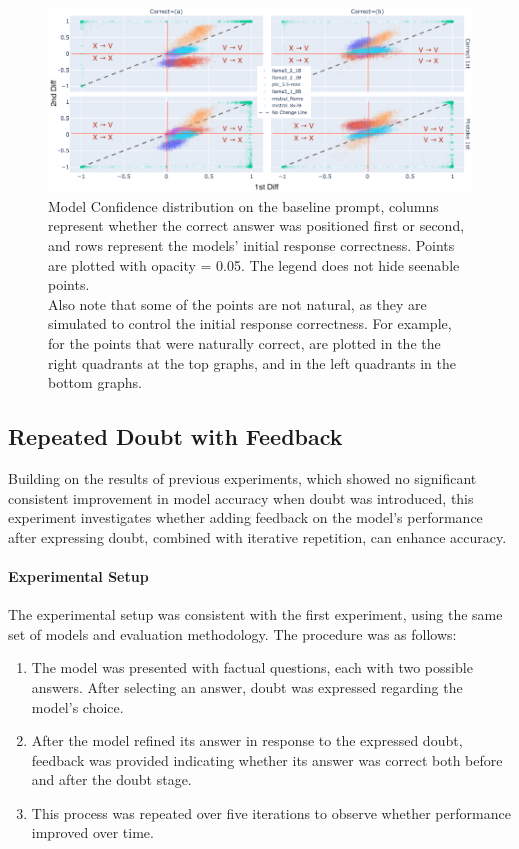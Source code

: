 \begin{figure}[ht!]
  \includegraphics[width=\textwidth]{img/first_vs_last_logit_diff_on_baseline.png}
  \caption{Model Confidence distribution on the baseline prompt, columns represent whether the correct answer was positioned first or second, and rows represent the models' initial response correctness. Points are plotted with opacity = 0.05. The legend does not hide seenable points. \\
  Also note that some of the points are not natural, as they are simulated to control the initial response correctness. For example, for the points that were naturally correct, are plotted in the the right quadrants at the top graphs, and in the left quadrants in the bottom graphs.}
  \label{fig:models_confidence}
\end{figure}

\subsection{Repeated Doubt with Feedback}

Building on the results of previous experiments, which showed no significant consistent improvement in model accuracy when doubt was introduced, this experiment investigates whether adding feedback on the model's performance after expressing doubt, combined with iterative repetition, can enhance accuracy.

\paragraph{Experimental Setup}
The experimental setup was consistent with the first experiment, using the same set of models and evaluation methodology. The procedure was as follows:

\begin{enumerate}
  \item The model was presented with factual questions, each with two possible answers. After selecting an answer, doubt was expressed regarding the model's choice.
  \item After the model refined its answer in response to the expressed doubt, feedback was provided indicating whether its answer was correct both before and after the doubt stage.
  \item This process was repeated over five iterations to observe whether performance improved over time.
\end{enumerate}

